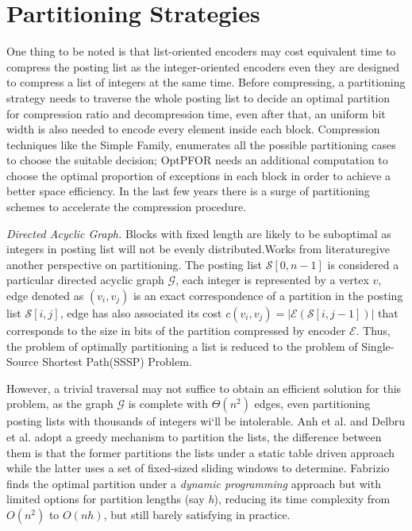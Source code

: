 \documentclass[runningheads,a4paper]{llncs}
\begin{document}
\section{Partitioning Strategies}
One thing to be noted is that list-oriented encoders may cost equivalent time to compress the posting list as the integer-oriented encoders even they are designed to compress a list of integers at the same time. Before compressing, a partitioning strategy needs to traverse the whole posting list to decide an optimal partition for compression ratio and decompression time, even after that, an uniform bit width is also needed to encode every element inside each block. Compression techniques like the Simple Family\cite{anh2005inverted,anh2010index}, enumerates all the possible partitioning cases to choose the suitable decision; OptPFOR\cite{yan2009inverted} needs an additional computation to choose the optimal proportion of exceptions in each block in order to achieve a better space efficiency. In the last few years there is a surge of partitioning schemes to accelerate the compression procedure\cite{lemire2015decoding,ottaviano2014partitioned}.

\textit{Directed Acyclic Graph.}
Blocks with fixed length are likely to be suboptimal as integers in posting list will not be evenly distributed.Works from literature\cite{anh2004index,delbru2012searching,silvestri2010vsencoding}give another perspective on partitioning. The posting list $\mathcal{S}[0,n-1]$ is considered a particular directed acyclic graph $\mathcal{G}$, each integer is represented by a vertex $v$, edge denoted as $\left( v_{i}, v_{j} \right)$ is an exact correspondence of a partition in the posting list $\mathcal{S}\left[i,j \right]$, edge has also associated its cost $c(v_{i},v_{j})=\left| \mathcal{E}\left(\mathcal{S}\left[i,j-1 \right] \right) \right| $ that corresponds to the size in bits of the partition compressed by encoder $\mathcal{E}$. Thus, the problem of optimally partitioning a list is reduced to the problem of Single-Source Shortest Path(SSSP) Problem.

However, a trivial traversal may not suffice to obtain an efficient solution for this problem, as the graph $\mathcal{G}$ is complete with $\Theta\left( n^{2}\right)$ edges, even partitioning posting lists with thousands of integers wi`ll be intolerable. Anh et al.\cite{anh2004index} and Delbru et al.\cite{delbru2012searching} adopt a greedy mechanism to partition the lists, the difference between them is that the former partitions the lists under a static table driven approach while the latter uses a set of fixed-sized sliding windows to determine. Fabrizio\cite{silvestri2010vsencoding} finds the optimal partition under a \textit{dynamic programming} approach but with limited options for partition lengths (say \textit{h}), reducing its time complexity from $O(n^{2})$ to $O(nh)$, but still barely satisfying in practice.
\end{document}
